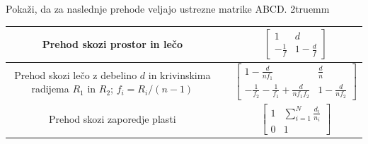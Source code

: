 \begin{naloga}
Pokaži, da za naslednje prehode veljajo ustrezne matrike ABCD.
\vglue2truemm
\begin{tabular}{|c|c|c|} \hline  
      Prehod skozi prostor in lečo & \parbox[c]{3cm}{\def\svgwidth{3cm}} & 
      $\begin{bmatrix} 1 & d\\ -\frac{1}{f} & 1-\frac{d}{f} \end{bmatrix}$ \\ \hline
      \parbox[c]{12em}{Prehod skozi lečo z debelino $d$ 
      in krivinskima radijema $R_1$ in $R_2$; $f_{i}=R_{i}/(n-1)$}& 
      \parbox[c]{3cm}{\def\svgwidth{3cm}} & 
      $\begin{bmatrix} 1-\frac{d}{nf_{1}} & \frac{d}{n}\\
      -\frac{1}{f_2}- \frac{1}{f_1}+\frac{d}{nf_1f_2}& 1-\frac{d}{nf_{2}} \end{bmatrix}$
      \\ \hline
      Prehod skozi zaporedje plasti & \parbox[c]{3cm}{\def\svgwidth{3cm}} & 
      $\begin{bmatrix} 1 & \sum_{i=1}^{N}\frac{d_{i}}{n_{i}}\\ 0 & 1 \end{bmatrix}$ \\ \hline 
\end{tabular}
\end{naloga}

